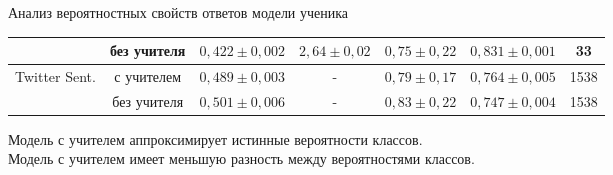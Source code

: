 \documentclass[10pt,pdf,hyperref={unicode}]{beamer}
\begin{document}
\begin{frame}{Анализ вероятностных свойств ответов модели ученика}
\begin{table}[]
\begin{center}
{\begin{tabular}{|l|c|c|c|c|c|c|}
                              & без учителя & $0{,}422\pm0{,}002$                                                & $2{,}64\pm0{,}02$                                                                             & $0{,}75\pm0{,}22$                                               & $0{,}831\pm0{,}001$ & 33                                                         \\ \hline \hline
\multirow{2}{*}{Twitter Sent.}       & с учителем  & $0{,}489\pm0{,}003$                                               & -                                                                                             & $0{,}79\pm0{,}17$                                               & $0{,}764\pm0{,}005$ & 1538                                                       \\ \cline{2-7} 
                              & без учителя &  $0{,}501\pm0{,}006$                                                & -                                                                                             & $0{,}83\pm0{,}22$                                               & $0{,}747\pm0{,}004$ & 1538                                                       \\ \hline 
\end{tabular}
}
\end{center}
\end{table}
{\color{blue}Модель с учителем аппроксимирует истинные вероятности классов.}\\
{\color{red}Модель с учителем имеет меньшую разность между вероятностями классов.}
\end{frame}

\end{document}
